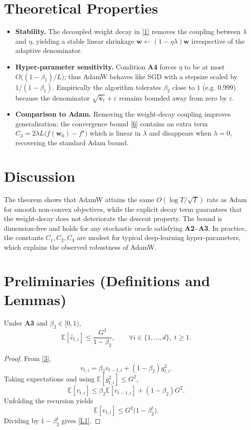 \documentclass{article}
\newcommand{\E}{\mathbb{E}}
\begin{document}
\section*{Theoretical Properties}
\begin{itemize}
\item \textbf{Stability.} The decoupled weight decay in \eqref{1} removes the coupling between $\lambda$ and $\eta$, yielding a stable linear shrinkage $\bm w\leftarrow (1-\eta\lambda)\bm w$ irrespective of the adaptive denominator.
\item \textbf{Hyper‑parameter sensitivity.} Condition \textbf{A4} forces $\eta$ to be at most $O\!\bigl((1-\beta_{1})/\!L\bigr)$; thus AdamW behaves like SGD with a stepsize scaled by $1/(1-\beta_{1})$. Empirically the algorithm tolerates $\beta_{2}$ close to $1$ (e.g. $0.999$) because the denominator $\sqrt{\hat{\bm v}_t}+\varepsilon$ remains bounded away from zero by $\varepsilon$.
\item \textbf{Comparison to Adam.} Removing the weight‑decay coupling improves generalisation; the convergence bound \eqref{6} contains an extra term $C_{3}=2\lambda L\bigl(f(\bm w_{0})-f^{\star}\bigr)$ which is linear in $\lambda$ and disappears when $\lambda=0$, recovering the standard Adam bound.
\end{itemize}

\section*{Discussion}
The theorem shows that AdamW attains the same $O(\log T/\sqrt{T})$ rate as Adam for smooth non‑convex objectives, while the explicit decay term guarantees that the weight‑decay does not deteriorate the descent property. The bound is dimension‑free and holds for any stochastic oracle satisfying \textbf{A2–A3}. In practice, the constants $C_{1},C_{2},C_{3}$ are modest for typical deep‑learning hyper‑parameters, which explains the observed robustness of AdamW.

\newpage
\section*{Preliminaries (Definitions and Lemmas)}
\begin{lemma}\label{lem:moment}
Under \textbf{A3} and $\beta_{2}\in[0,1)$,
\[
    \E\!\left[\hat{v}_{t,i}\right]\le \frac{G^{2}}{1-\beta_{2}},\qquad
    \forall i\in\{1,\dots,d\},\;t\ge 1.
\tag{L1}
\]
\end{lemma}
\begin{proof}
From \eqref{3},
\[
    v_{t,i}= \beta_{2} v_{t-1,i}+(1-\beta_{2})g_{t,i}^{2}.
\]
Taking expectations and using $ \E[g_{t,i}^{2}]\le G^{2}$,
\[
    \E[v_{t,i}]\le \beta_{2}\E[v_{t-1,i}] + (1-\beta_{2})G^{2}.
\]
Unfolding the recursion yields
\[
    \E[v_{t,i}]\le G^{2}\bigl(1-\beta_{2}^{t}\bigr).
\]
Dividing by $1-\beta_{2}^{t}$ gives \eqref{L1}. \qedhere
\end{proof}
\end{document}

